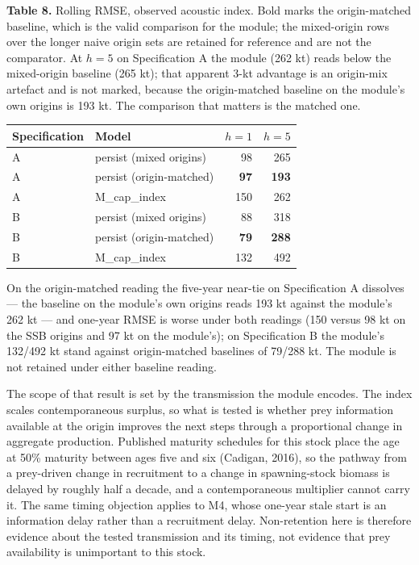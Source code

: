 \documentclass[11pt]{article}
\begin{document}
\textbf{Table 8.} Rolling RMSE, observed acoustic index. Bold marks the
origin-matched baseline, which is the valid comparison for the module;
the mixed-origin rows over the longer naive origin sets are retained for
reference and are not the comparator. At \(h=5\) on Specification A
the module (262 kt) reads below the mixed-origin baseline (265 kt); that
apparent 3-kt advantage is an origin-mix artefact and is not marked,
because the origin-matched baseline on the module's own origins is
193 kt. The comparison that matters is the matched one.

\begin{longtable}[]{@{}llrr@{}}
\toprule\noalign{}
Specification & Model & \(h=1\) & \(h=5\) \\
\midrule\noalign{}
\endhead
\bottomrule\noalign{}
\endlastfoot
A & persist (mixed origins) & 98 & 265 \\
A & persist (origin-matched) & \textbf{97} & \textbf{193} \\
A & M\_cap\_index & 150 & 262 \\
B & persist (mixed origins) & 88 & 318 \\
B & persist (origin-matched) & \textbf{79} & \textbf{288} \\
B & M\_cap\_index & 132 & 492 \\
\end{longtable}

On the origin-matched reading the five-year near-tie on Specification A
dissolves --- the baseline on the module's own origins reads 193 kt
against the module's 262 kt --- and one-year RMSE is worse under both
readings (150 versus 98 kt on the SSB origins and 97 kt on the
module's); on Specification B the module's 132/492 kt stand against
origin-matched baselines of 79/288 kt. The module is not retained under
either baseline reading.

The scope of that result is set by the transmission the module encodes.
The index scales contemporaneous surplus, so what is tested is whether
prey information available at the origin improves the next steps through
a proportional change in aggregate production. Published maturity
schedules for this stock place the age at 50\% maturity between ages
five and six (Cadigan, 2016), so the pathway from a prey-driven change in
recruitment to a change in spawning-stock biomass is delayed by roughly
half a decade, and a contemporaneous multiplier cannot carry it. The same
timing objection applies to M4, whose one-year stale start is an
information delay rather than a recruitment delay. Non-retention here is
therefore evidence about the tested transmission and its timing, not
evidence that prey availability is unimportant to this stock.
\end{document}
